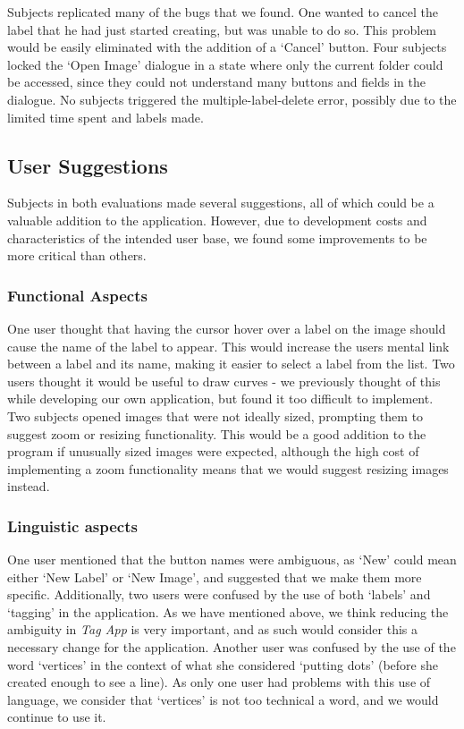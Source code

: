 \documentclass[11pt,twocolumn]{article}
\begin{document}
Subjects replicated many of the bugs that we found. One wanted to cancel the
label that he had just started creating, but was unable to do so. This problem
would be easily eliminated with the addition of a `Cancel' button. Four
subjects locked the `Open Image' dialogue in a state where only the current
folder could be accessed, since they could not understand many buttons and
fields in the dialogue. No subjects triggered the multiple-label-delete
error, possibly due to the limited time spent and labels made.

\subsection{User Suggestions}

Subjects in both evaluations made several suggestions, all of which could be a
valuable addition to the application. However, due to development costs and
characteristics of the intended user base, we found some improvements to be
more critical than others.

\subsubsection{Functional Aspects}

One user thought that having the cursor hover over a label on the image should
cause the name of the label to appear. This would increase the users mental
link between a label and its name, making it easier to select a label from the
list. Two users thought it would be useful to draw curves - we previously
thought of this while developing our own application, but found it too
difficult to implement. Two subjects opened images that were not ideally sized,
prompting them to suggest zoom or resizing functionality. This would be a good
addition to the program if unusually sized images were expected, although the
high cost of implementing a zoom functionality means that we would suggest
resizing images instead.

\subsubsection{Linguistic aspects}

One user mentioned that the button names were ambiguous, as `New' could mean
either `New Label' or `New Image', and suggested that we make them more
specific. Additionally, two users were confused by the use of both `labels' and
`tagging' in the application. As we have mentioned above, we think reducing the
ambiguity in \emph{Tag App} is very important, and as such would consider this a
necessary change for the application. Another user was confused by the use of
the word `vertices' in the context of what she considered `putting dots'
(before she created enough to see a line). As only one user had problems with
this use of language, we consider that `vertices' is not too technical a word,
and we would continue to use it.
\end{document}
